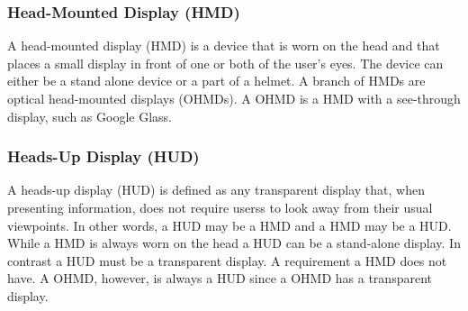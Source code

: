 \subsubsection{Head-Mounted Display (HMD)}
\label{subsubsec:hmd}
A head-mounted display (HMD)\cite{hmdWiki} is a device that is worn on the head and that places a small display in front of one or both of the user's eyes. The device can either be a stand alone device or a part of a helmet. A branch of HMDs are optical head-mounted displays (OHMDs)\cite{ohmdWiki}. A OHMD is a HMD with a see-through display, such as Google Glass.

\subsubsection{Heads-Up Display (HUD)}
\label{subsubsec:hud}
A heads-up display (HUD)\cite{hudWiki} is defined as any transparent display that, when presenting information, does not require userss to look away from their usual viewpoints. In other words, a HUD may be a HMD and a HMD may be a HUD. While a HMD is always worn on the head a HUD can be a stand-alone display. In contrast a HUD must be a transparent display. A requirement a HMD does not have. A OHMD, however, is always a HUD since a OHMD has a transparent display.

